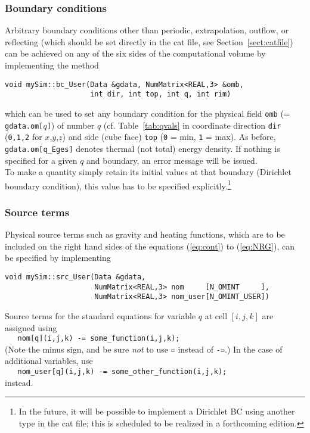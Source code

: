 \subsubsection{Boundary conditions}

Arbitrary boundary conditions other than periodic, extrapolation,
outflow, or reflecting (which should be set directly in the cat file,
see Section~\ref{sect:catfile}) can be achieved on any of the six sides
of the computational volume by implementing the method
\begin{verbatim}
void mySim::bc_User(Data &gdata, NumMatrix<REAL,3> &omb,
                    int dir, int top, int q, int rim) 
\end{verbatim}
which can be used to set any boundary condition for the physical field
{\tt omb} (= {\tt gdata.om[$q$]}) of number $q$ (cf. Table~\ref{tab:qvals}
in coordinate direction {\tt dir} ({\tt 0,1,2} for $x$,$y$,$z$) and side
(cube face) {\tt top} ({\tt 0} = min, {\tt 1} = max). As before,
\verb+gdata.om[q_Eges]+ denotes thermal (not total) energy density. If nothing
is specified for a given $q$ and boundary, an error message will be issued. \\
To make a quantity simply retain its initial values at that boundary (Dirichlet
boundary condition), this value has to be specified explicitly.\footnote{In the
future, it will be possible to implement a Dirichlet BC using another type in
the cat file; this is scheduled to be realized in a forthcoming edition.}


\subsubsection{Source terms}
Physical source terms such as gravity and heating functions, which are
to be included on the right hand sides of the equations
(\ref{eq:cont}) to (\ref{eq:NRG}), can be specified by implementing
\begin{verbatim}
void mySim::src_User(Data &gdata,
                     NumMatrix<REAL,3> nom     [N_OMINT     ],
                     NumMatrix<REAL,3> nom_user[N_OMINT_USER])
\end{verbatim}
Source terms for the standard equations for variable $q$ at cell
$[i,j,k]$ are assigned using \\
\verb+   nom[q](i,j,k) -= some_function(i,j,k);+ \\
(Note the minus sign, and be sure {\it not} to use {\tt =} instead of
{\tt -=}.) In the case of additional variables, use\\
\verb+   nom_user[q](i,j,k) -= some_other_function(i,j,k);+ \\
instead.

